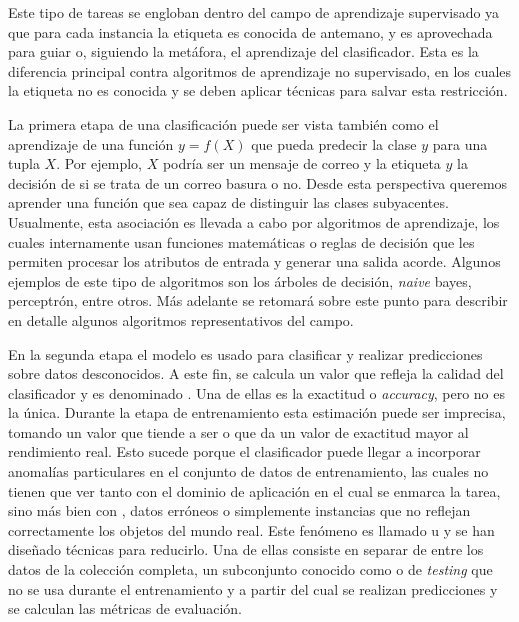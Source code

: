 Este tipo de tareas se engloban dentro del campo de aprendizaje supervisado ya
que para cada instancia la etiqueta es conocida de antemano, y es aprovechada
para guiar o, siguiendo la metáfora,  el aprendizaje del
clasificador. Esta es la diferencia principal contra algoritmos de aprendizaje
no supervisado, en los cuales la etiqueta no es conocida y se deben aplicar
técnicas para salvar esta restricción.

La primera etapa de una clasificación puede ser vista también como el
aprendizaje de una función $y=f(X)$ que pueda predecir la clase $y$ para una
tupla $X$. Por ejemplo, $X$ podría ser un mensaje de correo y la etiqueta $y$ la
decisión de si se trata de un correo basura o no. Desde esta perspectiva
queremos aprender una función que sea capaz de distinguir las clases
subyacentes.  Usualmente, esta asociación es llevada a cabo por algoritmos de
aprendizaje, los cuales internamente usan funciones matemáticas o reglas de
decisión que les permiten procesar los atributos de entrada y generar una salida
acorde. Algunos ejemplos de este tipo de algoritmos son los árboles de decisión,
\textit{naive} bayes, perceptrón, entre otros. Más adelante se retomará sobre
este punto para describir en detalle algunos algoritmos representativos del
campo.

En la segunda etapa el modelo es usado para clasificar y realizar predicciones
sobre datos desconocidos. A este fin, se calcula un valor que refleja la calidad
del clasificador y es denominado . Una de ellas
es la exactitud o \textit{accuracy}, pero no es la única.  Durante la etapa de
entrenamiento esta estimación puede ser imprecisa, tomando un valor que tiende a
ser  o que da un valor de exactitud mayor al rendimiento
real.  Esto sucede porque el clasificador puede llegar a incorporar anomalías
particulares en el conjunto de datos de entrenamiento, las cuales no tienen que
ver tanto con el dominio de aplicación en el cual se enmarca la tarea, sino más
bien con , datos erróneos o simplemente instancias que no
reflejan correctamente los objetos del mundo real. Este fenómeno es llamado
 u  y se han diseñado técnicas
para reducirlo. Una de ellas consiste en separar de entre los datos de la
colección completa, un subconjunto conocido como  o
de \textit{testing} que no se usa durante el entrenamiento y a partir del cual
se realizan predicciones y se calculan las métricas de evaluación.

